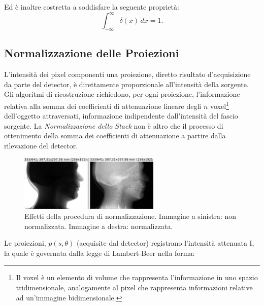 \documentclass[a4paper,12pt, doubleside]{report}
\begin{document}
                    Ed è inoltre costretta a soddisfare la seguente proprietà:
                    \begin{equation}
                        \int_{-\infty}^\infty \delta(x) \, dx = 1.
                    \end{equation}
            
            \subsection{Normalizzazione delle Proiezioni}
                \label{sec:normalizzazione}
                \par
                    L'intensità dei pixel componenti una proiezione, diretto risultato d'acquisizione da parte del detector, è direttamente proporzionale all'intensità della sorgente. Gli algoritmi di ricostruzione richiedono, per ogni proiezione, l'informazione relativa alla somma dei coefficienti di attenuazione lineare degli $n$ voxel\footnote{Il voxel è un elemento di volume che rappresenta l'informazione in uno spazio tridimensionale, analogamente al pixel che rappresenta informazioni relative ad un'immagine bidimensionale.} dell'oggetto attraversati, informazione indipendente dall'intensità del fascio sorgente. La \textit{Normalizzazione dello Stack} non è altro che il processo di ottenimento della somma dei coefficienti di attenuazione a partire dalla rilevazione del detector.
              
                    \begin{figure}[h]
                        \centering
                        \includegraphics[width=0.6\textwidth]{normalization}
                        \caption{Effetti della procedura di normalizzazione. Immagine a sinistra: non normalizzata. Immagine a destra: normalizzata.}
                        \label{fig:skull-phantom}
                    \end{figure}
                    
                    Le proiezioni, $p(s,\theta)$ (acquisite dal detector) registrano l'intensità attenuata I, la quale è governata dalla legge di Lambert-Beer \cite{lambert-beer} nella forma:
                    
\end{document}
